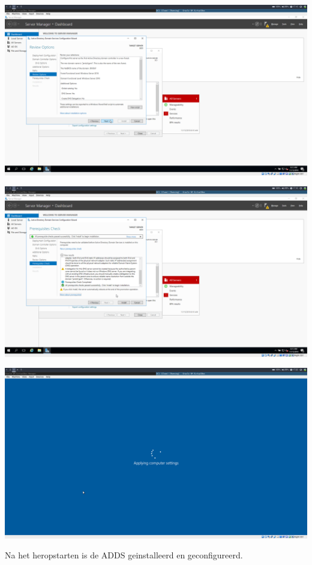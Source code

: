 \documentclass[a4paper]{article}
\begin{document}
\begin{center}
	\includegraphics[width=15cm]{Pictures/DC1/ADDS/1542298418.png}
\end{center}
\begin{center}
	\includegraphics[width=15cm]{Pictures/DC1/ADDS/1542298569.png}
\end{center}
\begin{center}
	\includegraphics[width=15cm]{Pictures/DC1/ADDS/1542298968.png}
	
	Na het heropstarten is de ADDS geinstalleerd en geconfigureerd.
\end{center}
\end{document}
